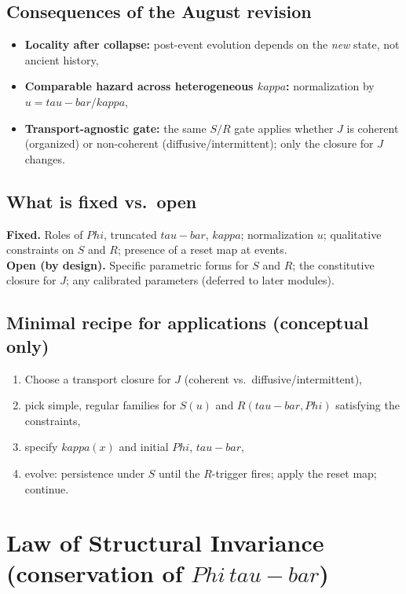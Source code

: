 \documentclass[12pt]{article}
\newcommand{\FoldDensity}{\Phi}
\newcommand{\FoldTime}{\bar{\tau}}
\newcommand{\Threshold}{\kappa}
\newcommand{\Survival}{S}
\newcommand{\Release}{R}
\def\FoldDensity{Phi}%
\def\FoldTime{tau-bar}%
\def\Threshold{kappa}%
\def\Survival{S}%
\def\Release{R}%
\def\bar#1{#1}%
\begin{document}
\subsection{Consequences of the August revision}
\begin{itemize}
  \item \textbf{Locality after collapse:} post-event evolution depends on the \emph{new} state, not ancient history,
  \item \textbf{Comparable hazard across heterogeneous $\Threshold$:} normalization by $u=\FoldTime/\Threshold$,
  \item \textbf{Transport-agnostic gate:} the same $\Survival/\Release$ gate applies whether $J$ is coherent (organized) or non-coherent (diffusive/intermittent); only the closure for $J$ changes.
\end{itemize}

\subsection{What is fixed vs.\ open}
\textbf{Fixed.} Roles of $\FoldDensity$, truncated $\FoldTime$, $\Threshold$; normalization $u$; qualitative constraints on $\Survival$ and $\Release$; presence of a reset map at events.\\
\textbf{Open (by design).} Specific parametric forms for $\Survival$ and $\Release$; the constitutive closure for $J$; any calibrated parameters (deferred to later modules).

\subsection{Minimal recipe for applications (conceptual only)}
\begin{enumerate}
  \item Choose a transport closure for $J$ (coherent vs.\ diffusive/intermittent),
  \item pick simple, regular families for $\Survival(u)$ and $\Release(\FoldTime,\FoldDensity)$ satisfying the constraints,
  \item specify $\Threshold(x)$ and initial $\FoldDensity$, $\FoldTime$,
  \item evolve: persistence under $\Survival$ until the $\Release$-trigger fires; apply the reset map; continue.
\end{enumerate}


\section[Law of Structural Invariance]{Law of Structural Invariance (conservation of $\FoldDensity\,\FoldTime$)}
\end{document}
